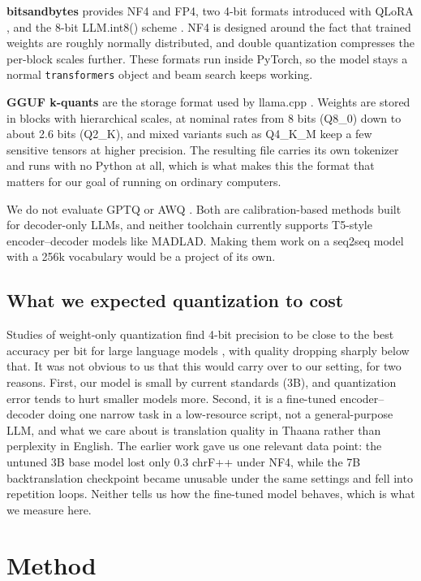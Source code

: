 \documentclass[10pt,twocolumn]{article}
\begin{document}
\textbf{bitsandbytes} provides NF4 and FP4, two 4-bit formats introduced
with QLoRA \citep{qlora}, and the 8-bit LLM.int8() scheme
\citep{llmint8}. NF4 is designed around the fact that trained weights are
roughly normally distributed, and double quantization compresses the
per-block scales further. These formats run inside PyTorch, so the model
stays a normal \texttt{transformers} object and beam search keeps
working.

\textbf{GGUF k-quants} \citep{kquants} are the storage format used by
llama.cpp \citep{llamacpp}. Weights are stored in blocks with
hierarchical scales, at nominal rates from 8 bits (Q8\_0) down to about
2.6 bits (Q2\_K), and mixed variants such as Q4\_K\_M keep a few
sensitive tensors at higher precision. The resulting file carries its own
tokenizer and runs with no Python at all, which is what makes this the
format that matters for our goal of running on ordinary computers.

We do not evaluate GPTQ \citep{gptq} or AWQ \citep{awq}. Both are
calibration-based methods built for decoder-only LLMs, and neither
toolchain currently supports T5-style encoder--decoder models like
MADLAD. Making them work on a seq2seq model with a 256k vocabulary would
be a project of its own.

\subsection{What we expected quantization to cost}

Studies of weight-only quantization find 4-bit precision to be close to
the best accuracy per bit for large language models \citep{fourbit}, with
quality dropping sharply below that. It was not obvious to us that this
would carry over to our setting, for two reasons. First, our model is
small by current standards (3B), and quantization error tends to hurt
smaller models more. Second, it is a fine-tuned encoder--decoder doing
one narrow task in a low-resource script, not a general-purpose LLM, and
what we care about is translation quality in Thaana rather than
perplexity in English. The earlier work gave us one relevant data point:
the untuned 3B base model lost only 0.3 chrF++ under NF4, while the 7B
backtranslation checkpoint became unusable under the same settings and
fell into repetition loops. Neither tells us how the fine-tuned model
behaves, which is what we measure here.

\section{Method}
\end{document}
